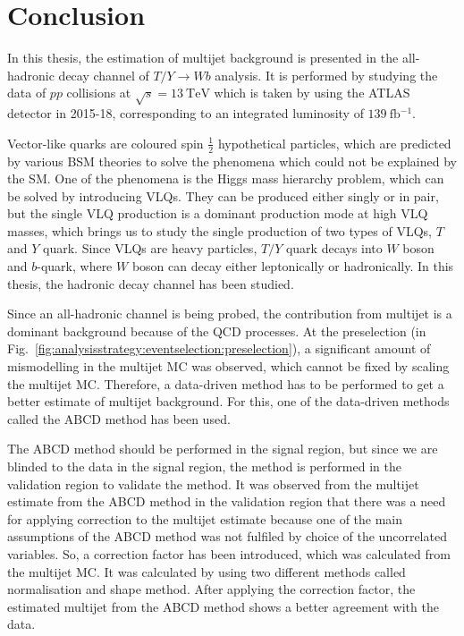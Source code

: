 


\chapter{Conclusion}
\label{sec:conclusion}
In this thesis, the estimation of multijet background is presented in the all-hadronic decay channel of $T/Y\rightarrow Wb$ analysis. It is performed by studying the data of $pp$ collisions at $\sqrt{s}=\SI{13}{\tera\electronvolt}$ which is taken by using the ATLAS detector in 2015-18, corresponding to an integrated luminosity of $\SI{139}{\femto\barn^{-1}}$. 

Vector-like quarks are coloured spin $\frac{1}{2}$ hypothetical particles, which are predicted by various BSM theories to solve the phenomena which could not be explained by the SM. One of the phenomena is the Higgs mass hierarchy problem, which can be solved by introducing VLQs. They can be produced either singly or in pair, but the single VLQ production is a dominant production mode at high VLQ masses, which brings us to study the single production of two types of VLQs, $T$ and $Y$ quark. Since VLQs are heavy particles, $T/Y$ quark decays into $W$ boson and $b$-quark, where $W$ boson can decay either leptonically or hadronically. In this thesis, the hadronic decay channel has been studied. 

Since an all-hadronic channel is being probed, the contribution from multijet is a dominant background because of the QCD processes. At the preselection (in Fig.\ \ref{fig:analysisstrategy:eventselection:preselection}), a significant amount of mismodelling in the multijet MC was observed, which cannot be fixed by scaling the multijet MC. Therefore, a data-driven method has to be performed to get a better estimate of multijet background. For this, one of the data-driven methods called the ABCD method has been used.

The ABCD method should be performed in the signal region, but since we are blinded to the data in the signal region, the method is performed in the validation region to validate the method. It was observed from the multijet estimate from the ABCD method in the validation region that there was a need for applying correction to the multijet estimate because one of the main assumptions of the ABCD method was not fulfiled by choice of the uncorrelated variables. So, a correction factor has been introduced, which was calculated from the multijet MC. It was calculated by using two different methods called normalisation and shape method. After applying the correction factor, the estimated multijet from the ABCD method shows a better agreement with the data.

